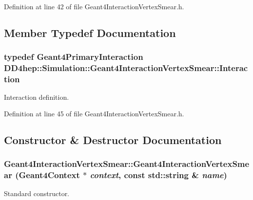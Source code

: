 Definition at line 42 of file Geant4InteractionVertexSmear.h.

\subsection{Member Typedef Documentation}
\hypertarget{class_d_d4hep_1_1_simulation_1_1_geant4_interaction_vertex_smear_ab70397967639759170996f67855a8c74}{
\subsubsection[{Interaction}]{\setlength{\rightskip}{0pt plus 5cm}typedef {\bf Geant4PrimaryInteraction} {\bf DD4hep::Simulation::Geant4InteractionVertexSmear::Interaction}}}
\label{class_d_d4hep_1_1_simulation_1_1_geant4_interaction_vertex_smear_ab70397967639759170996f67855a8c74}


Interaction definition. 

Definition at line 45 of file Geant4InteractionVertexSmear.h.

\subsection{Constructor \& Destructor Documentation}
\hypertarget{class_d_d4hep_1_1_simulation_1_1_geant4_interaction_vertex_smear_ad9e83f372fc7dc142f60a709e863d605}{
\subsubsection[{Geant4InteractionVertexSmear}]{\setlength{\rightskip}{0pt plus 5cm}Geant4InteractionVertexSmear::Geant4InteractionVertexSmear ({\bf Geant4Context} $\ast$ {\em context}, \/  const std::string \& {\em name})}}
\label{class_d_d4hep_1_1_simulation_1_1_geant4_interaction_vertex_smear_ad9e83f372fc7dc142f60a709e863d605}


Standard constructor. 


